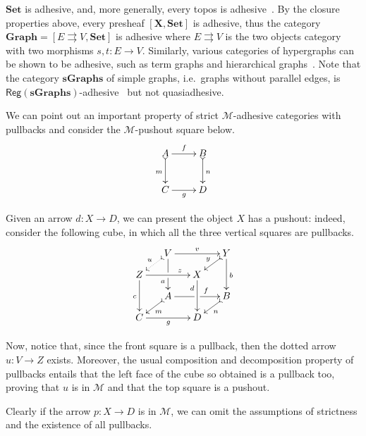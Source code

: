 \documentclass[runningheads,envcountsect]{llncs}
\newcommand{\cat}[1]{\ensuremath{\mathbf{#1}}}
\def\C{\textbf {\textup{C}}}
\newcommand{\reg}{\mathsf{Reg}}
\begin{document}
\begin{example}
	\label{ex:adhesive}
	$\cat{Set}$ is adhesive, and, more generally, every topos is
	adhesive~\cite{lack2006toposes}. By the closure properties above, every presheaf $[\cat{X},\cat{Set}]$ is adhesive, thus the category
	$\cat{Graph} = [ E \rightrightarrows V, \cat{Set}]$ is adhesive
	where $E \rightrightarrows {V}$ is the two objects category with two
	morphisms $s,t \colon{E} \to {V}$. Similarly, various
	categories of hypergraphs can be shown to be adhesive, such as term
	graphs and hierarchical graphs~\cite{CastelnovoGM24}. Note that the category $\cat{sGraphs}$ of simple graphs, 
	i.e.~graphs without parallel edges, is
	$\reg{(\cat{sGraphs})}$-adhesive~\cite{BehrHK23} but not
	quasiadhesive.
\end{example}


\begin{remark}\label{rem:deco}
	We can point out an important property of strict $\mathcal{M}$-adhesive categories with pullbacks and consider the $\mathcal{M}$-pushout square below.
	\[\xymatrix{A \ar[r]^{f} \ar@{>->}[d]_{m}& B \ar@{>->}[d]^{n}\\ C \ar[r]_{g} & D}\]
	
	Given an arrow $d\colon X\to D$, we can present the object $X$ has a pushout: indeed, consider the following cube, in which all the three vertical squares are pullbacks.
	\[
	\xymatrix@C=15pt@R=9pt{&V\ar[dd]|\hole_(.65){a}\ar[rr]^{v} \ar@{>.>}[dl]_{u} && Y \ar[dd]^{b} \ar@{>->}[dl]_{y} \\ Z  \ar[dd]_{c}\ar[rr]^(.7){z} & & X \ar[dd]_(.3){d}\\&A\ar[rr]|\hole^(.65){f} \ar@{>->}[dl]^{m} && B \ar@{>->}[dl]^{n} \\C \ar[rr]_{g} & & D }\]

Now, notice that, since the front square is a pullback, then the dotted arrow $u\colon V\to Z$ exists. Moreover, the usual composition and decomposition property of pullbacks \cite{mac2013categories} entails that the left face of the cube so obtained is a pullback too, proving that $u$ is in $\mathcal{M}$ and that the top square is a pushout.

	Clearly if the arrow $p\colon X\to D$ is in $\mathcal{M}$, we can omit the assumptions of strictness and the existence of all pullbacks.
\end{remark}
\end{document}

